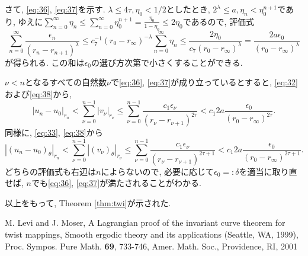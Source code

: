 \documentclass[a4paper]{ujarticle}
\numberwithin{equation}{section}
\theoremstyle{definition}
\begin{document}
        さて, \eqref{eq:36}, \eqref{eq:37}を示す.
        $\lambda \leq 4 \tau, \eta_0 < 1/2$としたとき, $2^{\lambda} \leq a, \eta_n < \eta_0^{n+1}$であり, 
        ゆえに$\displaystyle \sum_{n = 0}^{\infty} \eta_n \leq \sum_{n = 0}^{\infty} \eta_0^{n+1} = \frac{\eta_0}{1 - \eta_0} \leq 2 \eta_0$であるので,
        評価式
        \begin{equation} \label{eq:38}
            \sum_{n = 0}^{\infty} \frac{\epsilon_n}{(r_n - r_{n+1})^{\lambda}} \leq c_7^{-1} (r_0 - r_{\infty})^{- \lambda} \sum_{n = 0}^{\infty} \eta_n \leq \frac{2 \eta_0}{c_7 (r_0 - r_{\infty})^{\lambda}} = \frac{2 a \epsilon_0}{(r_0 - r_{\infty})^{\lambda}}
        \end{equation} 
        が得られる. この和は$\epsilon_0$の選び方次第で小さくすることができる.

        $\nu < n$となるすべての自然数$\nu$で\eqref{eq:36}, \eqref{eq:37}が成り立っているとすると,
        \eqref{eq:32}および\eqref{eq:38}から, 
        \[
            |u_n - u_0|_{r_n} < \sum_{\nu = 0}^{n - 1}|v_{\nu}|_{r_{\nu}} \leq \sum_{\nu = 0}^{n - 1} \frac{c_1 \epsilon_{\nu}}{(r_{\nu} - r_{\nu+1})^{2 \tau}} < c_1 2 a \frac{\epsilon_0}{(r_{0} - r_{\infty})^{2 \tau}}.
        \]
        同様に, \eqref{eq:33}, \eqref{eq:38}から
        \[
            |(u_n - u_0)_{\theta}|_{r_n} < \sum_{\nu = 0}^{n - 1}|(v_{\nu})_{\theta}|_{r_{\nu}} \leq \sum_{\nu = 0}^{n - 1} \frac{c_1 \epsilon_{\nu}}{(r_{\nu} - r_{\nu+1})^{2 \tau + 1}} < c_1 2 a \frac{\epsilon_0}{(r_{0} - r_{\infty})^{2 \tau + 1}}.
        \]
        どちらの評価式も右辺は$n$によらないので, 
        必要に応じて$\epsilon_0 =: \delta$を適当に取り直せば, $n$でも\eqref{eq:36}, \eqref{eq:37}が満たされることがわかる.

        以上をもって, Theorem \ref{thm:twi}が示された.
    \begin{thebibliography}{10}
    \nocite{*}
	  M. Levi and J. Moser, A Lagrangian proof of the invariant curve theorem for twist mappings, 
    Smooth ergodic theory and its applications (Seattle, WA, 1999), Proc. Sympos. Pure Math. \textbf{69}, 733-746, Amer. Math. Soc., Providence, RI, 2001 
\end{thebibliography}
\end{document}
